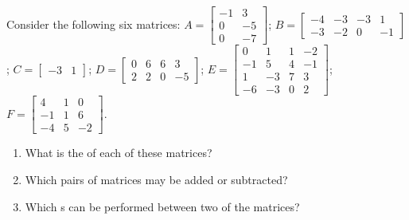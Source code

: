 \sectionExercises


\begin{exercise}  
Consider the following six matrices:
\(A=\begin{bmatrix} -1&3
\\0&-5
\\0&-7 \end{bmatrix}\);
\(B=\begin{bmatrix} -4&-3&-3&1
\\-3&-2&0&-1 \end{bmatrix}\);
\(C=\begin{bmatrix} -3&1 \end{bmatrix}\);
\(D=\begin{bmatrix} 0&6&6&3
\\2&2&0&-5 \end{bmatrix}\);
\(E=\begin{bmatrix} 0&1&1&-2
\\-1&5&4&-1
\\1&-3&7&3
\\-6&-3&0&2 \end{bmatrix}\);
\(F=\begin{bmatrix} 4&1&0
\\-1&1&6
\\-4&5&-2 \end{bmatrix}\).
\begin{enumerate}
\item What is the  of each of these matrices?

\item  Which pairs of matrices may be added or subtracted?

\item  Which s can be performed between two of the matrices?

\end{enumerate}
\end{exercise}






